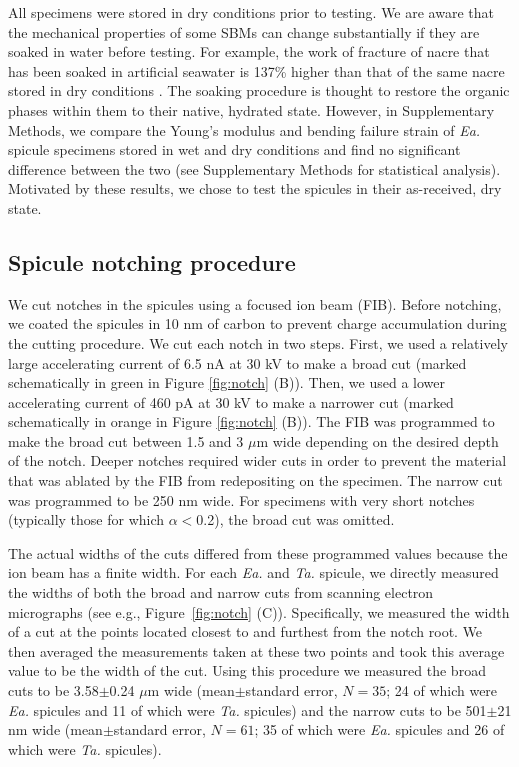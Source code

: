 \documentclass[12pt,onecolumn]{article}
\makeatletter
\newcommand{\TA}{\textit{Ta.\@}\xspace}
\newcommand{\EA}{\textit{Ea.\@}\xspace}
\makeatother
\begin{document}
All specimens were stored in dry conditions prior to testing. We are aware that the mechanical properties of some SBMs can change substantially if they are soaked in water before testing. For example, the work of fracture of nacre that has been soaked in artificial seawater is 137\% higher than that of the same nacre stored in dry conditions \cite{jackson1988}. The soaking procedure is thought to restore the organic phases within them to their native, hydrated state.  However, in Supplementary Methods, we compare the Young's modulus and bending failure strain of \EA spicule specimens stored in wet and dry conditions and find no significant difference between the two (see Supplementary Methods for statistical analysis). Motivated by these results, we chose to test the spicules in their as-received, dry state.

\subsection*{Spicule notching procedure}
\label{sec:notchconfig}
We cut notches in the spicules using a focused ion beam (FIB). Before notching, we coated the spicules in 10 nm of carbon to prevent charge accumulation during the cutting procedure. We cut each notch in two steps. First, we used a relatively large accelerating current of 6.5 nA at 30 kV to make a broad cut (marked schematically in green in Figure \ref{fig:notch} (B)). Then, we used a lower accelerating current of 460 pA at 30 kV to make a narrower cut (marked schematically in orange in Figure \ref{fig:notch} (B)). The FIB was programmed to make the broad cut between 1.5 and 3 $\mu$m wide depending on the desired depth of the notch. Deeper notches required wider cuts in order to prevent the material that was ablated by the FIB from redepositing on the specimen. The narrow cut was programmed to be 250 nm wide. For specimens with very short notches (typically those for which $\alpha<$0.2), the broad cut was omitted.

The actual widths of the cuts differed from these programmed values because the ion beam has a finite width. For each \EA and \TA spicule, we directly measured the widths of both the broad and narrow cuts from scanning electron micrographs (see e.g., Figure~\ref{fig:notch} (C)). Specifically, we measured the width of a cut at the points located closest to and furthest from the notch root. We then averaged the measurements taken at these two points and took this average value to be the width of the cut. Using this procedure we measured the broad cuts to be 3.58$\pm$0.24 $\mu$m wide (mean$\pm$standard error, $N=35$; 24 of which were \EA spicules and 11 of which were \TA spicules) and the narrow cuts to be 501$\pm$21 nm wide (mean$\pm$standard error, $N=61$; 35 of which were \EA spicules and 26 of which were \TA spicules).
\end{document}
